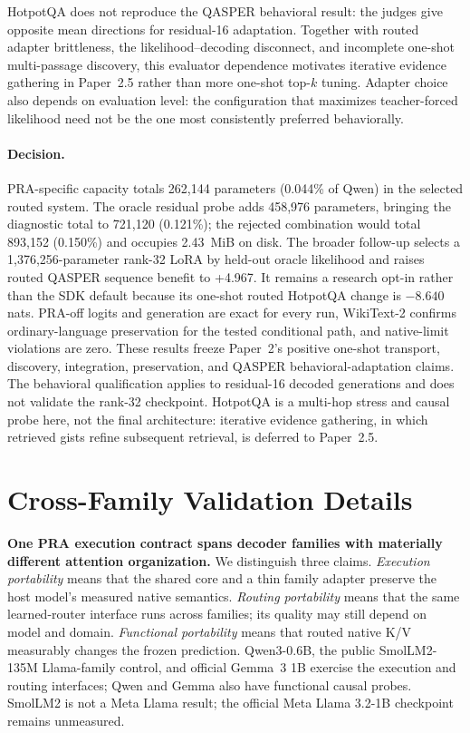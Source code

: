\documentclass[11pt]{article}
\begin{document}
HotpotQA does not reproduce the QASPER behavioral result: the judges give opposite mean directions
for residual-16 adaptation. Together with routed adapter brittleness, the likelihood--decoding
disconnect, and incomplete one-shot multi-passage discovery, this evaluator dependence motivates
iterative evidence gathering in Paper~2.5 rather than more one-shot top-$k$ tuning. Adapter choice
also depends on evaluation level: the configuration that maximizes teacher-forced likelihood need
not be the one most consistently preferred behaviorally.

\paragraph{Decision.}
PRA-specific capacity totals 262,144 parameters (0.044\% of Qwen) in the selected routed system.
The oracle residual probe adds 458,976 parameters, bringing the diagnostic total to 721,120
(0.121\%); the rejected combination would total 893,152 (0.150\%) and occupies 2.43~MiB on disk.
The broader follow-up selects a 1,376,256-parameter rank-32 LoRA by held-out oracle likelihood and
raises routed QASPER sequence benefit to +4.967. It remains a research opt-in rather than the SDK
default because its one-shot routed HotpotQA change is $-8.640$ nats. PRA-off logits and generation
are exact for every run, WikiText-2 confirms ordinary-language preservation for the tested
conditional path, and native-limit violations are zero. These results freeze Paper~2's positive
one-shot transport, discovery, integration, preservation, and QASPER behavioral-adaptation claims.
The behavioral qualification applies to residual-16 decoded generations and does not validate the
rank-32 checkpoint. HotpotQA is a multi-hop stress
and causal probe here, not the final architecture: iterative evidence gathering, in which
retrieved gists refine subsequent retrieval, is deferred to Paper~2.5.

\section{Cross-Family Validation Details}
\label{app:cross-family-details}

\textbf{One PRA execution contract spans decoder families with materially different attention
organization.} We distinguish three claims. \emph{Execution portability} means that the shared
core and a thin family adapter preserve the host model's measured native semantics.
\emph{Routing portability} means that the same learned-router interface runs across families;
its quality may still depend on model and domain. \emph{Functional portability} means that routed
native K/V measurably changes the frozen prediction. Qwen3-0.6B, the public SmolLM2-135M
Llama-family control, and official Gemma~3 1B exercise the execution and routing interfaces;
Qwen and Gemma also have functional causal probes. SmolLM2 is not a Meta Llama result; the official Meta
Llama 3.2-1B checkpoint remains unmeasured.
\end{document}
